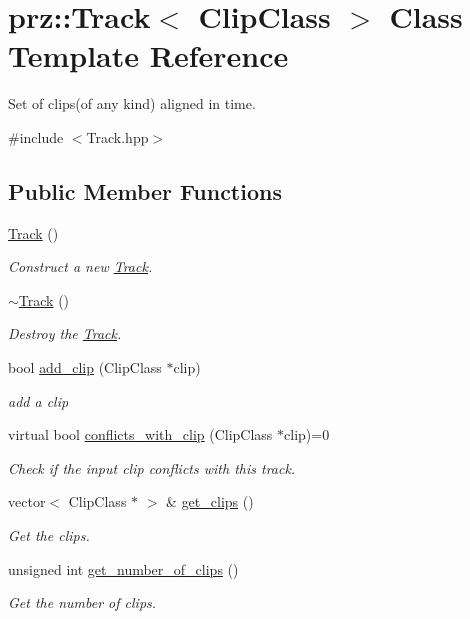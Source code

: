 \hypertarget{classprz_1_1_track}{}\section{prz\+::Track$<$ Clip\+Class $>$ Class Template Reference}
\label{classprz_1_1_track}


Set of clips(of any kind) aligned in time.  




{\ttfamily \#include $<$Track.\+hpp$>$}

\subsection*{Public Member Functions}
\begin{DoxyCompactItemize}
\item 
\mbox{\hyperlink{classprz_1_1_track_a65d3d9efb5a6640f94c5f22cacadd625}{Track}} ()
\begin{DoxyCompactList}\small\item\em Construct a new \mbox{\hyperlink{classprz_1_1_track}{Track}}. \end{DoxyCompactList}\item 
\mbox{\hyperlink{classprz_1_1_track_a84507a3e2e1cbb97d21298e73b7a24e3}{$\sim$\+Track}} ()
\begin{DoxyCompactList}\small\item\em Destroy the \mbox{\hyperlink{classprz_1_1_track}{Track}}. \end{DoxyCompactList}\item 
bool \mbox{\hyperlink{classprz_1_1_track_aa818d00358690b7dd76ae6e1eb788838}{add\+\_\+clip}} (Clip\+Class $\ast$clip)
\begin{DoxyCompactList}\small\item\em add a clip \end{DoxyCompactList}\item 
virtual bool \mbox{\hyperlink{classprz_1_1_track_aefad1eca406d312dbafec624435b4420}{conflicts\+\_\+with\+\_\+clip}} (Clip\+Class $\ast$clip)=0
\begin{DoxyCompactList}\small\item\em Check if the input clip conflicts with this track. \end{DoxyCompactList}\item 
vector$<$ Clip\+Class $\ast$ $>$ \& \mbox{\hyperlink{classprz_1_1_track_a54eb44634d26680f1851077e64991419}{get\+\_\+clips}} ()
\begin{DoxyCompactList}\small\item\em Get the clips. \end{DoxyCompactList}\item 
unsigned int \mbox{\hyperlink{classprz_1_1_track_a776b6d37978d945f406fc4922981a2a1}{get\+\_\+number\+\_\+of\+\_\+clips}} ()
\begin{DoxyCompactList}\small\item\em Get the number of clips. \end{DoxyCompactList}\end{DoxyCompactItemize}
